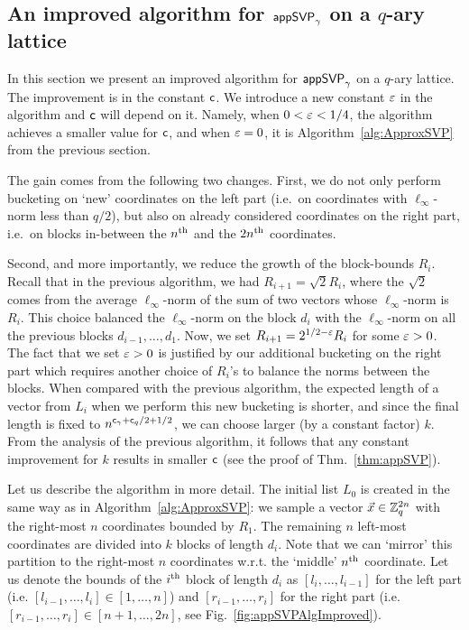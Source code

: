 \subsection{An improved algorithm for $\textsf{appSVP}_{\gamma}$ on a $q$-ary lattice} \label{subsec:qAryAlgImproved}

In this section we present an improved algorithm for $\textsf{appSVP}_{\gamma}$ on a $q$-ary lattice. The improvement is in the constant $\mathsf{c}$. We introduce a new constant $\varepsilon$ in the algorithm and $\mathsf{c}$ will depend on it. Namely, when $0<\varepsilon<1/4$, the algorithm achieves a smaller value for $\mathsf{c}$, and when $\varepsilon=0$, it is Algorithm~\ref{alg:ApproxSVP} from the previous section.

The gain comes from the following two changes. First, we do not only perform bucketing on `new' coordinates on the left part (i.e.\ on coordinates with $\ell_{\infty}$-norm less than $q/2$), but also on already considered coordinates on the right part, i.e.\ on blocks in-between the $n^{\mathrm{th}}$ and the $2n^{\mathrm{th}}$ coordinates. 

Second, and more importantly, we reduce the growth of the block-bounds $R_i$. Recall that in the previous algorithm, we had $R_{i+1} = \sqrt{2}R_i$, where the $\sqrt{2}$ comes from the average $\ell_{\infty}$-norm of the sum of two vectors whose $\ell_{\infty}$-norm is $R_i$. This choice balanced the $\ell_{\infty}$-norm on the block $d_i$ with the $\ell_{\infty}$-norm on all the previous blocks $d_{i-1}, \ldots, d_1$.
Now, we set $R_{i+1} = 2^{1/2 - \varepsilon}R_i$ for some $\varepsilon>0$. The fact that we set $\varepsilon>0$ is justified by our additional bucketing on the right part which requires another choice of $R_i$'s  to balance the norms between the blocks. When compared with the previous algorithm, the expected length of a vector from $L_i$ when we perform this new bucketing is shorter, and since the final length is fixed to $n^{\mathsf{c}_{\gamma}+\mathsf{c}_q/2+1/2}$, we can choose larger (by a constant factor) $k$. From the analysis of the previous algorithm, it follows that any constant improvement for $k$ results in smaller $\mathsf{c}$ (see the proof of Thm.~\ref{thm:appSVP}).

Let us describe the algorithm in more detail. The initial list $L_0$ is created in the same way as in Algorithm~\ref{alg:ApproxSVP}: we sample a vector $\vec x \in {{\mathbb Z}}_q^{2n}$ with the right-most $n$ coordinates bounded by $R_1$. The remaining $n$ left-most coordinates are divided into $k$ blocks of length $d_i$. Note that we can `mirror' this partition to the right-most $n$ coordinates w.r.t. the `middle' $n^{\mathrm{th}}$ coordinate. Let us denote the bounds of the $i^{\mathrm{th}}$ block of length $d_i$ as $[l_{i},\ldots, l_{i-1}]$ for the left part (i.e. $[l_{i-1},\ldots, l_{i}] \in [1, \ldots, n]$) and $[r_{i-1}, \ldots, r_{i}]$ for the right part (i.e.\ $[r_{i-1}, \ldots, r_{i}]\in [n+1, \ldots, 2n]$, see Fig.~\ref{fig:appSVPAlgImproved}).

